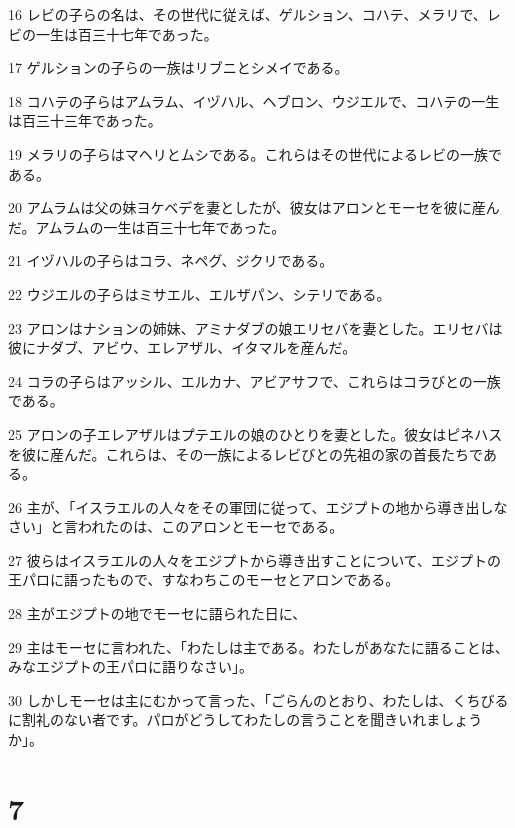 \par 16 レビの子らの名は、その世代に従えば、ゲルション、コハテ、メラリで、レビの一生は百三十七年であった。
\par 17 ゲルションの子らの一族はリブニとシメイである。
\par 18 コハテの子らはアムラム、イヅハル、ヘブロン、ウジエルで、コハテの一生は百三十三年であった。
\par 19 メラリの子らはマヘリとムシである。これらはその世代によるレビの一族である。
\par 20 アムラムは父の妹ヨケベデを妻としたが、彼女はアロンとモーセを彼に産んだ。アムラムの一生は百三十七年であった。
\par 21 イヅハルの子らはコラ、ネペグ、ジクリである。
\par 22 ウジエルの子らはミサエル、エルザパン、シテリである。
\par 23 アロンはナションの姉妹、アミナダブの娘エリセバを妻とした。エリセバは彼にナダブ、アビウ、エレアザル、イタマルを産んだ。
\par 24 コラの子らはアッシル、エルカナ、アビアサフで、これらはコラびとの一族である。
\par 25 アロンの子エレアザルはプテエルの娘のひとりを妻とした。彼女はピネハスを彼に産んだ。これらは、その一族によるレビびとの先祖の家の首長たちである。
\par 26 主が、「イスラエルの人々をその軍団に従って、エジプトの地から導き出しなさい」と言われたのは、このアロンとモーセである。
\par 27 彼らはイスラエルの人々をエジプトから導き出すことについて、エジプトの王パロに語ったもので、すなわちこのモーセとアロンである。
\par 28 主がエジプトの地でモーセに語られた日に、
\par 29 主はモーセに言われた、「わたしは主である。わたしがあなたに語ることは、みなエジプトの王パロに語りなさい」。
\par 30 しかしモーセは主にむかって言った、「ごらんのとおり、わたしは、くちびるに割礼のない者です。パロがどうしてわたしの言うことを聞きいれましょうか」。

\chapter{7}

